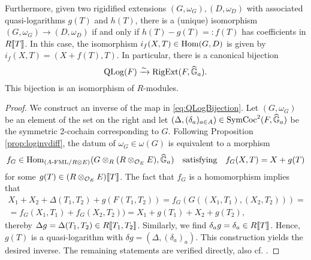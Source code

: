 \documentclass[../main.tex]{subfiles}
\begin{document}
\begin{thm}
Furthermore, given two rigidified extensions
$(G, \omega_G), (D, \omega_{D})$ with associated quasi-logarithms
$g(T)$ and $h(T)$, there is a (unique) isomorphism $(G, \omega_G) \to (D, \omega_{D})$
if and only if $h(T)-g(T) =\colon  f(T)$ has coefficients in $R\llbracket T \rrbracket$. 
In this case, the isomorphism $i_f(X,T) \in \operatorname{Hom}(G, D)$ is
given by $i_f(X,T) = (X+f(T), T)$. In particular, there is a canonical bijection
\begin{equation*}
  \operatorname {QLog}(F) \xrightarrow{\sim} \operatorname {RigExt}(F, \widehat{\mathbb{G}}_a).
\end{equation*}
This bijection is an isomorphism of $R$-modules.
\begin{proof}[Proof]
  We construct an inverse of the map in \eqref{eq:QLogBijection}. Let $(G,
  \omega_G)$ be an element of the set on the right
  and let $(\Delta, (\delta_a)_{a \in A}) \in
  \operatorname{SymCoc}^2(F, \widehat{\mathbb{G}}_a)$ be the symmetric 2-cochain corresponding to $G$.
  Following Proposition \ref{prop:loginvdiff}, the datum of 
  $\omega_G \in \omega(G)$ is equivalent to a morphism 
  $$f_G \in \operatorname{Hom}_{{({A}\textnormal-\allowbreak\mathrm{FML}/{R \otimes E})}}(G \otimes_R (R \otimes_{\mathcal{O}_E} E), \widehat{\mathbb{G}}_a)
  \quad \text{satisfying} \quad f_G(X,T) = X + g(T)$$
  for some $g(T) \in (R \otimes_{\mathcal{O}_E} E)\llbracket T \rrbracket$. The fact that 
  $f_G$ is a homomorphism implies that 
  \begin{multline*}
    X_1 + X_2 + \Delta(T_1, T_2) + g(F(T_1,T_2)) = f_G(G((X_1, T_1), (X_2, T_2))) = \\
    = f_G(X_1, T_1) + f_G(X_2, T_2)) = X_1 + g(T_1) + X_2 + g(T_2),
  \end{multline*}
  thereby $\Delta g = \Delta(T_1, T_2) \in R\llbracket T_1, T_2\rrbracket$. Similarly, 
  we find $\delta_a g = \delta_a \in R\llbracket T \rrbracket$. Hence, $g(T)$ is a
  quasi-logarithm with $\delta g = (\Delta, (\delta_a)_a)$. 
  This construction yields the desired inverse.
  The remaining statements are verified directly, also cf. \cite[
  8]{hopkins1994equivariant}.
\end{proof}
\end{thm}
\end{document}
